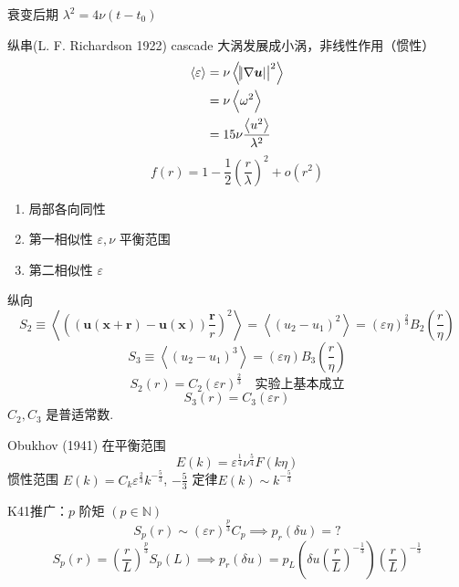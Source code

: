 \documentclass[12pt]{ctexart}
\begin{document}
衰变后期 $\lambda^2 = 4 \nu (t-t_0)$

纵串(L. F. Richardson 1922) cascade 大涡发展成小涡，非线性作用（惯性）
\begin{equation}
   \begin{aligned}
	  \left< \varepsilon \right>  & = \nu \left<  \abs{\abs{ \nabla \bm{u} }}^2 \right> \\
								  &= \nu \left< \omega^2 \right>  \\
								  &= 15\nu \frac{\left< u^2 \right> }{\lambda^2} \\
   \end{aligned}
\end{equation}
\begin{equation}
   f(r) = 1 - \frac{1}{2} \left( \frac{r}{\lambda} \right)^2 + o(r^2)
\end{equation}

\begin{enumerate}
   \item 局部各向同性
   \item 第一相似性 $\varepsilon, \nu$ 平衡范围
   \item 第二相似性  $\varepsilon$
\end{enumerate}
纵向
\begin{equation}
   S_2  \equiv \left< \left( ( \bm{u} (\bm{x} + \bm{r} ) - \bm{u} (\bm{x} )) \frac{\bm{r} }{r} \right)^2  \right>  = \left< \left( u_2 - u_1 \right)^2 \right> = \left( \varepsilon \eta \right)^{\frac{2}{3}} B_2 (\frac{r}{\eta})
\end{equation}
\begin{equation}
   S_3 \equiv \left< \left( u_2 - u_1 \right)^3 \right> = (\varepsilon \eta)B_3\left( \frac{r}{\eta} \right) 
\end{equation}
\begin{equation}
   S_2 (r) = C_2 (\varepsilon r)^{\frac{2}{3}} \quad \text{实验上基本成立}
\end{equation}
\begin{equation}
   S_3 (r) = C_3 (\varepsilon r)
\end{equation}
$C_2,C_3$ 是普适常数.

Obukhov (1941) 在平衡范围
\begin{equation}
   E(k) = \varepsilon^{\frac{1}{4}} \nu^{\frac{5}{4}} F(k\eta)
\end{equation}
惯性范围 $E(k) = C_k \varepsilon^{\frac{2}{3}} k^{-\frac{5}{3}}$, $-\frac{5}{3}$ 定律$E(k) \sim k^{-\frac{5}{3}}$

K41推广：$p$ 阶矩 $( p \in \mathbb{N} ) $
\begin{equation}
   S_p (r) \sim (\varepsilon r)^{\frac{p}{3}} C_p \implies p_r (\delta u) = ?
\end{equation}
\begin{equation}
   S_p(r) = \left( \frac{r}{L} \right) ^{\frac{p}{3}} S_p(L) \implies p_r (\delta u) = p_L\left(\delta u\left( \frac{r}{L} \right)^{-\frac{1}{3}}\right) \left(\frac{r}{L} \right)^{-\frac{1}{3}}
\end{equation}
\end{document}
